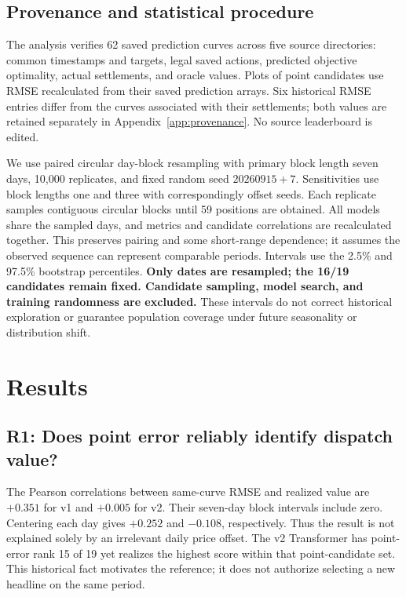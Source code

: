 \documentclass[11pt,a4paper]{article}
\begin{document}
\subsection{Provenance and statistical procedure}
The analysis verifies 62 saved prediction curves across five source directories: common timestamps and targets, legal saved actions, predicted objective optimality, actual settlements, and oracle values. Plots of point candidates use RMSE recalculated from their saved prediction arrays. Six historical RMSE entries differ from the curves associated with their settlements; both values are retained separately in Appendix~\ref{app:provenance}. No source leaderboard is edited.

We use paired circular day-block resampling with primary block length seven days, 10,000 replicates, and fixed random seed $20260915+7$. Sensitivities use block lengths one and three with correspondingly offset seeds. Each replicate samples contiguous circular blocks until 59 positions are obtained. All models share the sampled days, and metrics and candidate correlations are recalculated together. This preserves pairing and some short-range dependence; it assumes the observed sequence can represent comparable periods. Intervals use the 2.5\% and 97.5\% bootstrap percentiles. \textbf{Only dates are resampled; the 16/19 candidates remain fixed. Candidate sampling, model search, and training randomness are excluded.} These intervals do not correct historical exploration or guarantee population coverage under future seasonality or distribution shift.
\FloatBarrier

\section{Results}\label{sec:results}
\subsection{R1: Does point error reliably identify dispatch value?}
The Pearson correlations between same-curve RMSE and realized value are $+0.351$ for v1 and $+0.005$ for v2. Their seven-day block intervals include zero. Centering each day gives $+0.252$ and $-0.108$, respectively. Thus the result is not explained solely by an irrelevant daily price offset. The v2 Transformer has point-error rank 15 of 19 yet realizes the highest score within that point-candidate set. This historical fact motivates the reference; it does not authorize selecting a new headline on the same period.
\end{document}

